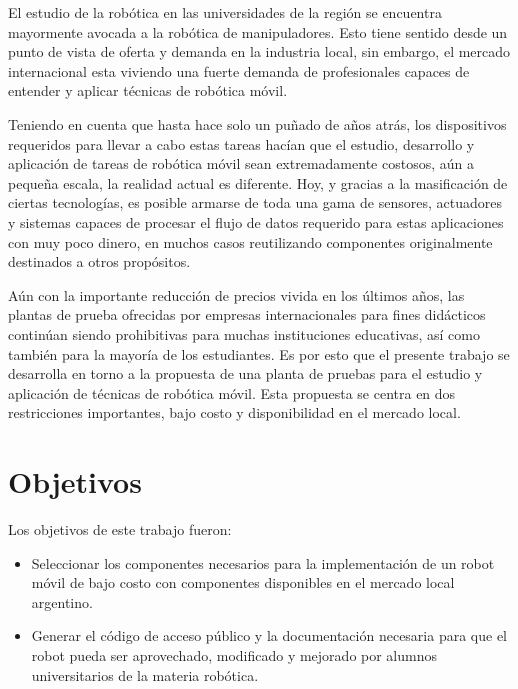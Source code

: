 El estudio de la robótica en las universidades de la región se encuentra mayormente avocada a la robótica de manipuladores. Esto tiene sentido desde un punto de vista de oferta y demanda en la industria local, sin embargo, el mercado internacional esta viviendo una fuerte demanda de profesionales capaces de entender y aplicar técnicas de robótica móvil.

Teniendo en cuenta que hasta hace solo un puñado de años atrás, los dispositivos requeridos para llevar a cabo estas tareas hacían que el estudio, desarrollo y aplicación de tareas de robótica móvil sean extremadamente costosos, aún a pequeña escala, la realidad actual es diferente. Hoy, y gracias a la masificación de ciertas tecnologías, es posible armarse de toda una gama de sensores, actuadores y sistemas capaces de procesar el flujo de datos requerido para estas aplicaciones con muy poco dinero, en muchos casos reutilizando componentes originalmente destinados a otros propósitos.

Aún con la importante reducción de precios vivida en los últimos años, las plantas de prueba ofrecidas por empresas internacionales para fines didácticos continúan siendo prohibitivas para muchas instituciones educativas, así como también para la mayoría de los estudiantes. Es por esto que el presente trabajo se desarrolla en torno a la propuesta de una planta de pruebas para el estudio y aplicación de técnicas de robótica móvil. Esta propuesta se centra en dos restricciones importantes, bajo costo y disponibilidad en el mercado local.


\section{Objetivos}

Los objetivos de este trabajo fueron:
\begin{itemize}
	\item Seleccionar los componentes necesarios para la implementación de un robot móvil de bajo costo con componentes disponibles en el mercado local argentino.
	\item Generar el código de acceso público y la documentación necesaria para que el robot pueda ser aprovechado, modificado y mejorado por alumnos universitarios de la materia robótica.
\end{itemize}

